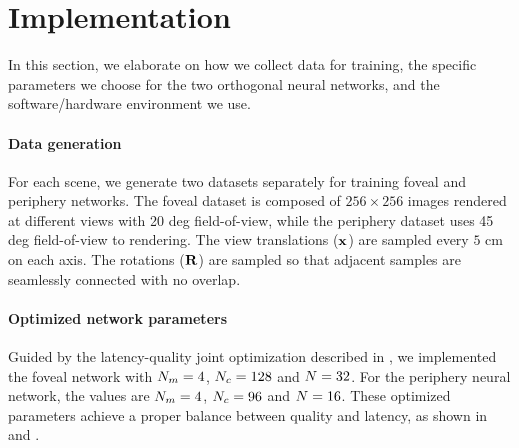 \section{Implementation}\label{sec:impl}
In this section, we elaborate on how we collect data for training, the specific parameters we choose for the two orthogonal neural networks, and the software/hardware environment we use.

\paragraph{Data generation}
For each scene, we generate two datasets separately for training foveal and periphery networks. The foveal dataset is composed of $256\times256$ images rendered at different views with 20 deg field-of-view, while the periphery dataset uses 45 deg field-of-view to rendering. The view translations ($\mathbf{x}$) are sampled every $5$ cm on each axis. The rotations ($\mathbf{R}$) are sampled so that adjacent samples are seamlessly connected with no overlap.
\paragraph{Optimized network parameters}
Guided by the latency-quality joint optimization described in , we implemented the foveal network with $N_{m}=4$, $N_{c}=128$ and $N = 32$. For the periphery neural network, the values are $N_{m}=4$, $N_{c}=96$ and $N = 16$. These optimized parameters achieve a proper balance between quality and latency, as shown in  and .


